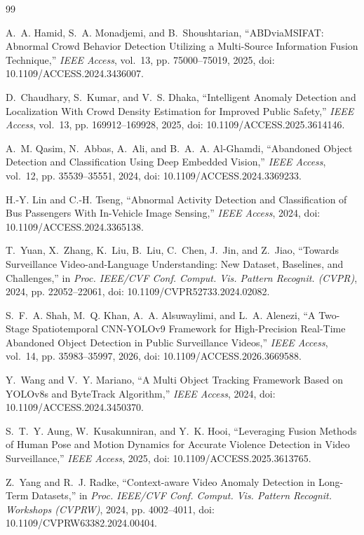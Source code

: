 \documentclass[12pt,a4paper]{report}
\begin{document}
\begin{thebibliography}{99}

A.~A. Hamid, S.~A. Monadjemi, and B.~Shoushtarian, ``ABDviaMSIFAT: Abnormal Crowd Behavior Detection Utilizing a Multi-Source Information Fusion Technique,'' \emph{IEEE Access}, vol.~13, pp. 75000--75019, 2025, doi: 10.1109/ACCESS.2024.3436007.

D.~Chaudhary, S.~Kumar, and V.~S. Dhaka, ``Intelligent Anomaly Detection and Localization With Crowd Density Estimation for Improved Public Safety,'' \emph{IEEE Access}, vol.~13, pp. 169912--169928, 2025, doi: 10.1109/ACCESS.2025.3614146.

A.~M. Qasim, N.~Abbas, A.~Ali, and B.~A.~A. Al-Ghamdi, ``Abandoned Object Detection and Classification Using Deep Embedded Vision,'' \emph{IEEE Access}, vol.~12, pp. 35539--35551, 2024, doi: 10.1109/ACCESS.2024.3369233.

H.-Y. Lin and C.-H. Tseng, ``Abnormal Activity Detection and Classification of Bus Passengers With In-Vehicle Image Sensing,'' \emph{IEEE Access}, 2024, doi: 10.1109/ACCESS.2024.3365138.

T.~Yuan, X.~Zhang, K.~Liu, B.~Liu, C.~Chen, J.~Jin, and Z.~Jiao, ``Towards Surveillance Video-and-Language Understanding: New Dataset, Baselines, and Challenges,'' in \emph{Proc. IEEE/CVF Conf. Comput. Vis. Pattern Recognit. (CVPR)}, 2024, pp. 22052--22061, doi: 10.1109/CVPR52733.2024.02082.

S.~F.~A. Shah, M.~Q. Khan, A.~A. Alsuwaylimi, and L.~A. Alenezi, ``A Two-Stage Spatiotemporal CNN-YOLOv9 Framework for High-Precision Real-Time Abandoned Object Detection in Public Surveillance Videos,'' \emph{IEEE Access}, vol.~14, pp. 35983--35997, 2026, doi: 10.1109/ACCESS.2026.3669588.

Y.~Wang and V.~Y. Mariano, ``A Multi Object Tracking Framework Based on YOLOv8s and ByteTrack Algorithm,'' \emph{IEEE Access}, 2024, doi: 10.1109/ACCESS.2024.3450370.

S.~T.~Y. Aung, W.~Kusakunniran, and Y.~K. Hooi, ``Leveraging Fusion Methods of Human Pose and Motion Dynamics for Accurate Violence Detection in Video Surveillance,'' \emph{IEEE Access}, 2025, doi: 10.1109/ACCESS.2025.3613765.

Z.~Yang and R.~J. Radke, ``Context-aware Video Anomaly Detection in Long-Term Datasets,'' in \emph{Proc. IEEE/CVF Conf. Comput. Vis. Pattern Recognit. Workshops (CVPRW)}, 2024, pp. 4002--4011, doi: 10.1109/CVPRW63382.2024.00404.


\end{thebibliography}
\end{document}
